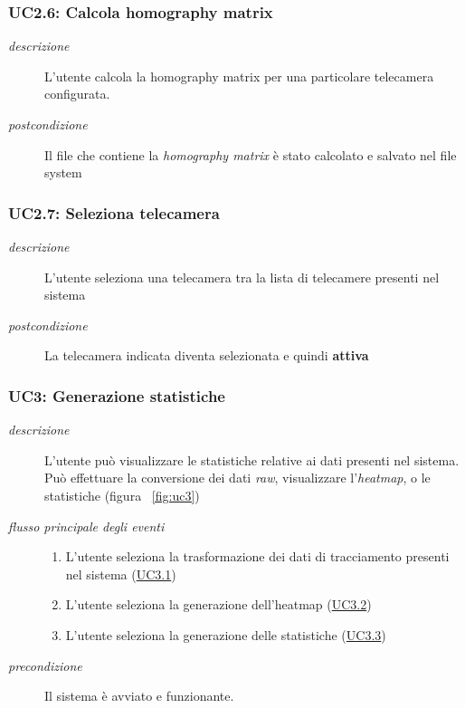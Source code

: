 \subsubsection{UC2.6: Calcola homography matrix} \label{sec:UC2.6}
\begin{description}
\item[\em{descrizione }]L'utente calcola la homography matrix per una particolare telecamera configurata.
\item[\em{postcondizione }] Il file che contiene la \textit{homography matrix} è stato calcolato e salvato nel file system
\end{description}

\subsubsection{UC2.7: Seleziona telecamera} \label{sec:UC2.7}
\begin{description}
\item[\em{descrizione }]L'utente seleziona una telecamera tra la lista di telecamere presenti nel sistema
\item[\em{postcondizione }] La telecamera indicata diventa selezionata e quindi \textbf{attiva}
\end{description}

\subsubsection{UC3: Generazione statistiche} \label{sec:UC3}
\begin{description}
\item[\em{descrizione }]L'utente può visualizzare le statistiche relative ai dati presenti nel sistema. Può effettuare la conversione dei dati \textit{raw}, visualizzare l'\textit{heatmap}, o le statistiche (figura ~\ref{fig:uc3})
\item[\em{flusso principale degli eventi }] \mbox{}
 \begin{enumerate}
\item L'utente seleziona la trasformazione dei dati di tracciamento presenti nel sistema (\hyperref[sec:uc3.1]{UC3.1})
\item L'utente seleziona la generazione dell'heatmap (\hyperref[sec:uc3.2]{UC3.2})
\item L'utente seleziona la generazione delle statistiche (\hyperref[sec:uc3.3]{UC3.3})
\end{enumerate}
\item[\em{precondizione }] Il sistema è avviato e funzionante.
\end{description}

